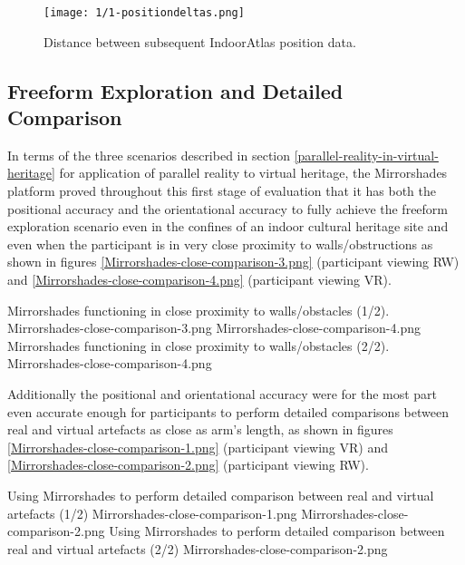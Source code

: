 \begin{figure}[ht]
	\begin{center}
		\texttt{[image: 1/1-positiondeltas.png]}
		\caption{Distance between subsequent IndoorAtlas position data.}
		\label{1-positiondeltas.png}
	\end{center}
\end{figure}


\subsection{Freeform Exploration and Detailed Comparison}

In terms of the three scenarios described in section \ref{parallel-reality-in-virtual-heritage} for application of parallel reality to virtual heritage, the Mirrorshades platform proved throughout this first stage of evaluation that it has both the positional accuracy and the orientational accuracy to fully achieve the freeform exploration scenario even in the confines of an indoor cultural heritage site and even when the participant is in very close proximity to walls/obstructions as shown in figures \ref{Mirrorshades-close-comparison-3.png} (participant viewing RW) and \ref{Mirrorshades-close-comparison-4.png} (participant viewing VR).

 {Mirrorshades functioning in close proximity to walls/obstacles (1/2).} {Mirrorshades-close-comparison-3.png}
       {Mirrorshades-close-comparison-4.png} {Mirrorshades functioning in close proximity to walls/obstacles (2/2).} {Mirrorshades-close-comparison-4.png}

Additionally the positional and orientational accuracy were for the most part even accurate enough for participants to perform detailed comparisons between real and virtual artefacts as close as arm's length, as shown in figures \ref{Mirrorshades-close-comparison-1.png} (participant viewing VR) and \ref{Mirrorshades-close-comparison-2.png} (participant viewing RW).

 {Using Mirrorshades to perform detailed comparison between real and virtual artefacts (1/2)} {Mirrorshades-close-comparison-1.png}
       {Mirrorshades-close-comparison-2.png} {Using Mirrorshades to perform detailed comparison between real and virtual artefacts (2/2)} {Mirrorshades-close-comparison-2.png}


